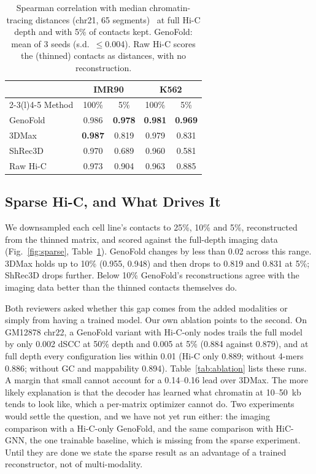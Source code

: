 \documentclass[conference]{IEEEtran}
\begin{document}
\begin{table}[t]
\caption{Spearman correlation with median chromatin-tracing distances
(chr21, 65 segments)~\cite{bintu2018} at full Hi-C depth and with 5\% of
contacts kept. GenoFold: mean of 3 seeds (s.d.\ $\le$0.004). Raw Hi-C
scores the (thinned) contacts as distances, with no reconstruction.}
\label{tab:fish}
\centering
\setlength{\tabcolsep}{4pt}
\begin{tabular}{@{}lcccc@{}}
\toprule
 & \multicolumn{2}{c}{IMR90} & \multicolumn{2}{c}{K562} \\
\cmidrule(lr){2-3}\cmidrule(l){4-5}
Method & 100\% & 5\% & 100\% & 5\% \\
\midrule
GenoFold   & 0.986 & \textbf{0.978} & \textbf{0.981} & \textbf{0.969} \\
3DMax      & \textbf{0.987} & 0.819 & 0.979 & 0.831 \\
ShRec3D    & 0.970 & 0.689 & 0.960 & 0.581 \\
Raw Hi-C   & 0.973 & 0.904 & 0.963 & 0.885 \\
\bottomrule
\end{tabular}
\end{table}

\subsection{Sparse Hi-C, and What Drives It}
We downsampled each cell line's contacts to 25\%, 10\% and 5\%,
reconstructed from the thinned matrix, and scored against the full-depth
imaging data (Fig.~\ref{fig:sparse}, Table~\ref{tab:fish}). GenoFold
changes by less than 0.02 across this range. 3DMax holds up to 10\%
(0.955, 0.948) and then drops to 0.819 and 0.831 at 5\%; ShRec3D drops
further. Below 10\% GenoFold's reconstructions agree with the imaging
data better than the thinned contacts themselves do.

Both reviewers asked whether this gap comes from the added modalities or
simply from having a trained model. Our own ablation points to the
second. On GM12878 chr22, a GenoFold variant with Hi-C-only nodes trails
the full model by only 0.002 dSCC at 50\% depth and 0.005 at 5\% (0.884
against 0.879), and at full depth every configuration lies within 0.01
(Hi-C only 0.889; without 4-mers 0.886; without GC and mappability
0.894). Table~\ref{tab:ablation} lists these runs. A margin that small cannot account for a 0.14--0.16 lead over
3DMax. The more likely explanation is that the decoder has learned what
chromatin at 10--50~kb tends to look like, which a per-matrix optimizer
cannot do. Two experiments would settle the question, and we have not
yet run either: the imaging comparison with a Hi-C-only GenoFold, and
the same comparison with HiC-GNN, the one trainable baseline, which is
missing from the sparse experiment. Until they are done we state the
sparse result as an advantage of a trained reconstructor, not of
multi-modality.
\end{document}
